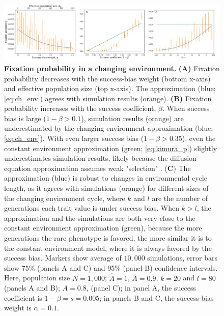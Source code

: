 \documentclass[12pt]{extarticle}
\begin{document}
\begin{figure}[H]
	\centering
    \includegraphics[width=0.6\linewidth, height=0.7\textheight,keepaspectratio]{ch_env.pdf}
  \caption{\textbf{Fixation probability in a changing environment.}
\textbf{(A)} Fixation probability decreases with {the} success-bias weight (bottom x-axis) and effective population size (top x-axis). The approximation (blue; \cref{eq:ch_env}) agrees with simulation results (orange). 
\textbf{(B)} Fixation probability increases with the success coefficient, $\beta$.
When success bias is large ($1-\beta > 0.1$),  
simulation results (orange) are underestimated by the changing environment approximation (blue; \cref{eq:ch_env}). With even larger success bias ($1-\beta > 0.35$), even the constant environment approximation (green; \cref{eq:kimura_p}) slightly underestimates simulation results, likely because the diffusion equation approximation assumes weak "selection" .
(\textbf{C}) The approximation (blue) is robust to changes in environmental cycle length, as it agrees with simulations (orange) for different sizes of the changing environment cycle, where $k$ and $l$ are the number of generations each trait value is under success bias. 
When $k>l$, the approximation and the simulations are both very close to the constant environment approximation (green), because the more generations the rare phenotype is favored, the more similar it is to the constant environment model, where it is always favored by the success bias.
Markers show average of $10,000$ simulations, error bars show 75\% (panels A and C) and 95\% (panel B) confidence intervals.
Here, population size $N=1,000$; $\hat{A}=1$, $A=0.9$, $k=20$ and $l=80$ (panels A and B); $A=0.8$, (panel C); in panel A, the success coefficient is $1-\beta=s=0.005$; in panels B and C, the success-bias weight is $\alpha=0.1$.
  }
  \label{fig:ch_env_alpha_beta}
\end{figure}


\end{document}
